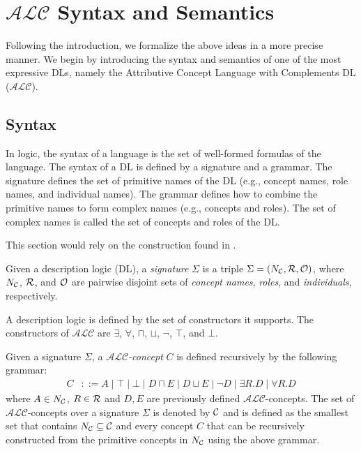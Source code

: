 \section{$\mathcal{ALC}$ Syntax and Semantics}
\label{appendixA:section:dl_syntax_semantics}

Following the introduction, we formalize the above ideas in a more precise manner.
We begin by introducing the syntax and semantics of one of the most expressive DLs, namely the Attributive Concept Language with Complements DL ($\mathcal{ALC}$).

\subsection{Syntax}
\label{dl_syntax_semantics:subsection:dl_syntax}

In logic, the syntax of a language is the set of well-formed formulas of the language.
The syntax of a DL is defined by a signature and a grammar.
The signature defines the set of primitive names of the DL (e.g., concept names, role names, and individual names). 
The grammar defines how to combine the primitive names to form complex names (e.g., concepts and roles).
The set of complex names is called the set of concepts and roles of the DL.

This section would rely on the construction found in \cite{DLhandbook}.

\begin{definition}[Signature]
    Given a description logic (DL), a
     \emph{signature} $\Sigma$ is a triple $\Sigma = (N_{\mathcal{C}}, \mathcal{R}, \mathcal{O})$,
    where $N_{\mathcal{C}}$, $\mathcal{R}$, and $\mathcal{O}$ are pairwise disjoint sets of \emph{concept names}, \emph{roles}, and \emph{individuals}, respectively.
\end{definition}

A description logic is defined by the set of constructors it supports.
The constructors of $\mathcal{ALC}$ are $\exists$, $\forall$, $\sqcap$, $\sqcup$, $\neg$, $\top$, and $\bot$.

\begin{definition}
    Given a signature $\Sigma$, 
    a \emph{$\mathcal{ALC}$-concept} $C$ is defined recursively by the following grammar:
    \begin{align*}
        C &::= A \mid \top \mid \bot \mid D \sqcap E \mid D \sqcup E \mid \neg D \mid \exists R.D \mid \forall R.D
    \end{align*}
    where $A \in N_{\mathcal{C}}$, $R \in \mathcal{R}$ and $D, E$ are previously defined $\mathcal{ALC}$-concepts.
    The set of $\mathcal{ALC}$-concepts over a signature $\Sigma$ is denoted by $\mathcal{C}$ and is defined as the smallest 
    set that contains $N_{\mathcal{C}} \subseteq \mathcal{C}$ and every concept $C$ that can be recursively constructed 
    from the primitive concepts in $N_{\mathcal{C}}$ using the above grammar.
\end{definition}

